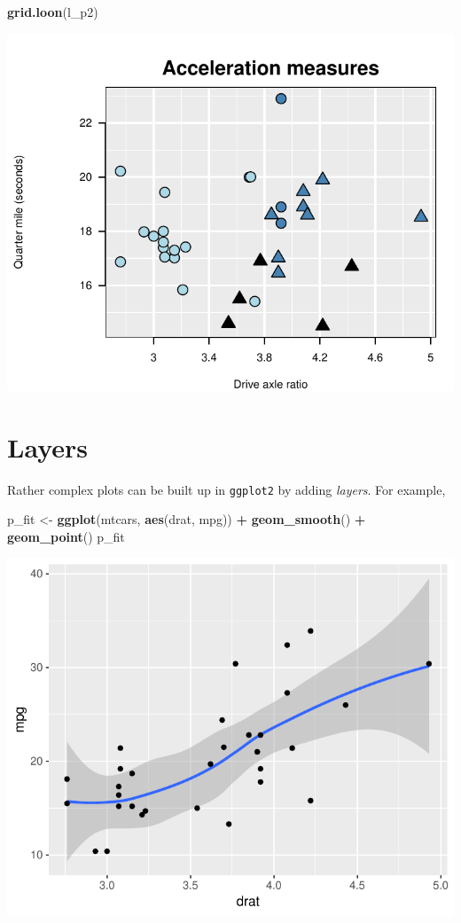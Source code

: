 \documentclass[]{article}
\newenvironment{Shaded}{\begin{snugshade}}{\end{snugshade}}
\newcommand{\KeywordTok}[1]{\textcolor[rgb]{0.13,0.29,0.53}{\textbf{#1}}}
\newcommand{\StringTok}[1]{\textcolor[rgb]{0.31,0.60,0.02}{#1}}
\newcommand{\OperatorTok}[1]{\textcolor[rgb]{0.81,0.36,0.00}{\textbf{#1}}}
\newcommand{\NormalTok}[1]{#1}
\begin{document}
\begin{Shaded}
\begin{Highlighting}[]
\KeywordTok{grid.loon}\NormalTok{(l_p2)}
\end{Highlighting}
\end{Shaded}

\begin{center}\includegraphics[width=0.7\linewidth]{ggplots2loon_files/figure-latex/changed glyphs l_p2-1} \end{center}

\section{Layers}\label{layers}

Rather complex plots can be built up in \texttt{ggplot2} by adding
\emph{layers}. For example,

\begin{Shaded}
\begin{Highlighting}[]
\NormalTok{p_fit <-}\StringTok{ }\KeywordTok{ggplot}\NormalTok{(mtcars, }\KeywordTok{aes}\NormalTok{(drat, mpg)) }\OperatorTok{+}\StringTok{ }\KeywordTok{geom_smooth}\NormalTok{() }\OperatorTok{+}\StringTok{ }\KeywordTok{geom_point}\NormalTok{()}
\NormalTok{p_fit}
\end{Highlighting}
\end{Shaded}

\begin{center}\includegraphics[width=0.7\linewidth]{ggplots2loon_files/figure-latex/mtcars smooth-1} \end{center}
\end{document}
